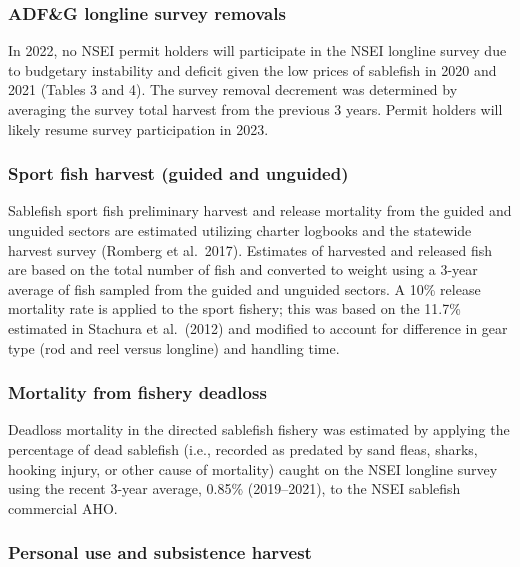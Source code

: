 \documentclass[
]{article}
\begin{document}
\hypertarget{adfg-longline-survey-removals}{%
\subsubsection{ADF\&G longline survey removals}\label{adfg-longline-survey-removals}}

In 2022, no NSEI permit holders will participate in the NSEI longline survey due to budgetary instability and deficit given the low prices of sablefish in 2020 and 2021 (Tables 3 and 4). The survey removal decrement was determined by averaging the survey total harvest from the previous 3 years. Permit holders will likely resume survey participation in 2023.

\hypertarget{sport-fish-harvest-guided-and-unguided}{%
\subsubsection{Sport fish harvest (guided and unguided)}\label{sport-fish-harvest-guided-and-unguided}}

Sablefish sport fish preliminary harvest and release mortality from the guided and unguided sectors are estimated utilizing charter logbooks and the statewide harvest survey (Romberg et al.~2017). Estimates of harvested and released fish are based on the total number of fish and converted to weight using a 3-year average of fish sampled from the guided and unguided sectors. A 10\% release mortality rate is applied to the sport fishery; this was based on the 11.7\% estimated in Stachura et al.~(2012) and modified to account for difference in gear type (rod and reel versus longline) and handling time.

\hypertarget{mortality-from-fishery-deadloss}{%
\subsubsection{Mortality from fishery deadloss}\label{mortality-from-fishery-deadloss}}

Deadloss mortality in the directed sablefish fishery was estimated by applying the percentage of dead sablefish (i.e., recorded as predated by sand fleas, sharks, hooking injury, or other cause of mortality) caught on the NSEI longline survey using the recent 3-year average, 0.85\% (2019--2021), to the NSEI sablefish commercial AHO.

\hypertarget{personal-use-and-subsistence-harvest}{%
\subsubsection{Personal use and subsistence harvest}\label{personal-use-and-subsistence-harvest}}
\end{document}
